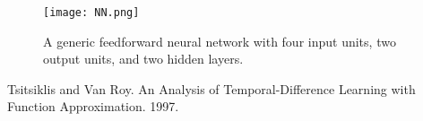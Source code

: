 \documentclass{article}
\begin{document}
\begin{figure}
    \centering
    \texttt{[image: NN.png]}
    \caption{A generic feedforward neural network with four input units, two output units, and two hidden layers.}
    \label{fig:nn}
\end{figure}

\begin{thebibliography}{9}



Tsitsiklis and Van Roy. An Analysis of Temporal-Difference Learning with Function Approximation. 1997.

\end{thebibliography}
\end{document}
